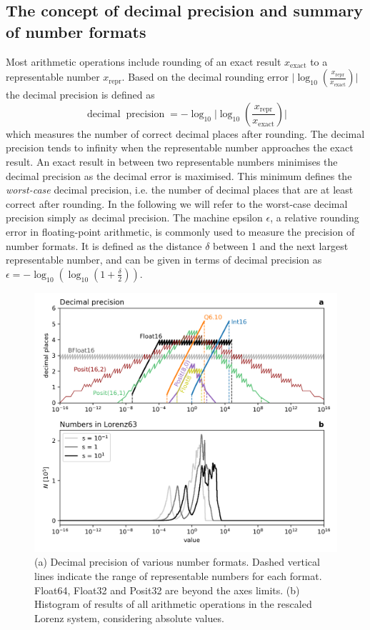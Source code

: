 \documentclass[draft]{agujournal2019}
\newcommand{\op}{\operatorname}
\begin{document}
\subsection{The concept of decimal precision and summary of number formats}
\label{sec:decprec}

Most arithmetic operations include rounding of an exact result $x_\text{exact}$
to a representable number $x_\text{repr}$. Based on the decimal rounding error
$\vert \log_{10}( \tfrac{x_\text{repr}}{x_\text{exact}} ) \vert$ the decimal precision
is defined as \cite{Gustafson2017}
\begin{equation}
\op{decimal} \op{precision} = -\log_{10} \vert \log_{10}( \frac{x_\text{repr}}{x_\text{exact}} ) \vert
\end{equation}
which measures the number of correct decimal places after rounding. The decimal precision tends to infinity when the representable number approaches the exact result. An exact result in between two representable numbers minimises the decimal precision as the decimal error is maximised. This minimum defines the \emph{worst-case} decimal precision, i.e. the number of decimal places that are at least correct after rounding. In the following we will refer to the worst-case decimal precision simply as decimal precision.
The machine epsilon $\epsilon$, a relative rounding error in floating-point arithmetic,
is commonly used to measure the precision of number formats. It is defined as the
distance $\delta$ between 1 and the next largest representable number, and can be
given in terms of decimal precision as $\epsilon = -\log_{10} ( \log_{10}( 1 + \tfrac{\delta}{2} ))$.

\begin{figure}[htbp]
\includegraphics[width=1\textwidth]{decimal_precision.png}
\caption{(a) Decimal precision of various number formats. Dashed vertical lines indicate the range of representable numbers for each format. Float64, Float32 and Posit32 are beyond the axes limits. (b) Histogram of results of all arithmetic operations in the rescaled Lorenz system, considering absolute values.}
\label{fig:dec_prec}
\end{figure}
\end{document}
